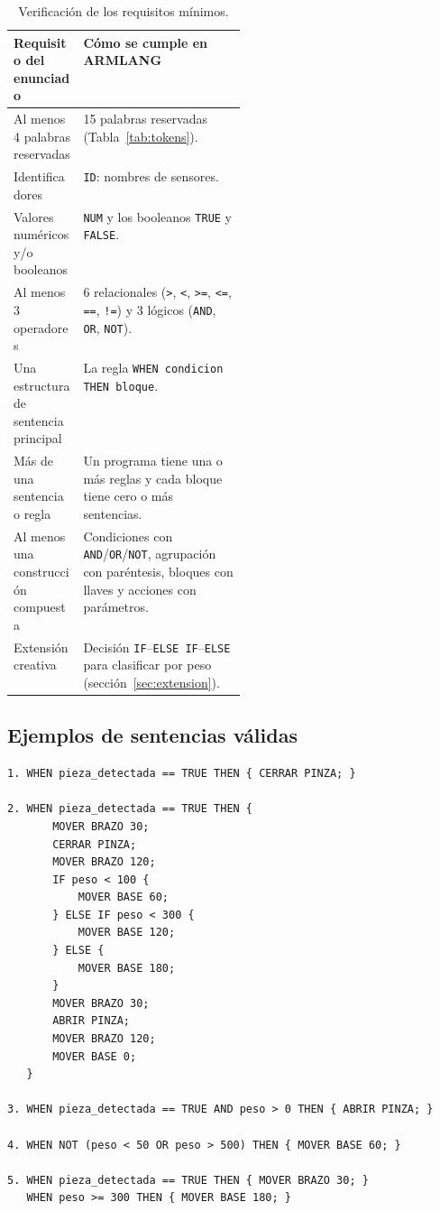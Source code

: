 \documentclass[10pt,a4paper]{article}
\newcommand{\tm}[1]{\texttt{#1}}                                          %
\begin{document}
\begin{table}[H]
\centering\small
\begin{tabularx}{\linewidth}{|L{0.30\linewidth}|X|}
\hline
\textbf{Requisito del enunciado} & \textbf{Cómo se cumple en ARMLANG} \\
\hline
Al menos 4 palabras reservadas & 15 palabras reservadas (Tabla~\ref{tab:tokens}). \\
\hline
Identificadores & \tm{ID}: nombres de sensores. \\
\hline
Valores numéricos y/o booleanos & \tm{NUM} y los booleanos \tm{TRUE} y \tm{FALSE}. \\
\hline
Al menos 3 operadores & 6 relacionales (\tm{>}, \tm{<}, \tm{>=}, \tm{<=}, \tm{==}, \tm{!=}) y 3 lógicos (\tm{AND}, \tm{OR}, \tm{NOT}). \\
\hline
Una estructura de sentencia principal & La regla \tm{WHEN condicion THEN bloque}. \\
\hline
Más de una sentencia o regla & Un programa tiene una o más reglas y cada bloque tiene cero o más sentencias. \\
\hline
Al menos una construcción compuesta & Condiciones con \tm{AND}/\tm{OR}/\tm{NOT}, agrupación con paréntesis, bloques con llaves y acciones con parámetros. \\
\hline
Extensión creativa & Decisión \tm{IF}--\tm{ELSE IF}--\tm{ELSE} para clasificar por peso (sección~\ref{sec:extension}). \\
\hline
\end{tabularx}
\caption{Verificación de los requisitos mínimos.}
\label{tab:requisitos}
\end{table}

\subsection{Ejemplos de sentencias válidas}
\label{sec:ej_validos}

\begin{lstlisting}
1. WHEN pieza_detectada == TRUE THEN { CERRAR PINZA; }

2. WHEN pieza_detectada == TRUE THEN {
       MOVER BRAZO 30;
       CERRAR PINZA;
       MOVER BRAZO 120;
       IF peso < 100 {
           MOVER BASE 60;
       } ELSE IF peso < 300 {
           MOVER BASE 120;
       } ELSE {
           MOVER BASE 180;
       }
       MOVER BRAZO 30;
       ABRIR PINZA;
       MOVER BRAZO 120;
       MOVER BASE 0;
   }

3. WHEN pieza_detectada == TRUE AND peso > 0 THEN { ABRIR PINZA; }

4. WHEN NOT (peso < 50 OR peso > 500) THEN { MOVER BASE 60; }

5. WHEN pieza_detectada == TRUE THEN { MOVER BRAZO 30; }
   WHEN peso >= 300 THEN { MOVER BASE 180; }
\end{lstlisting}
\end{document}
